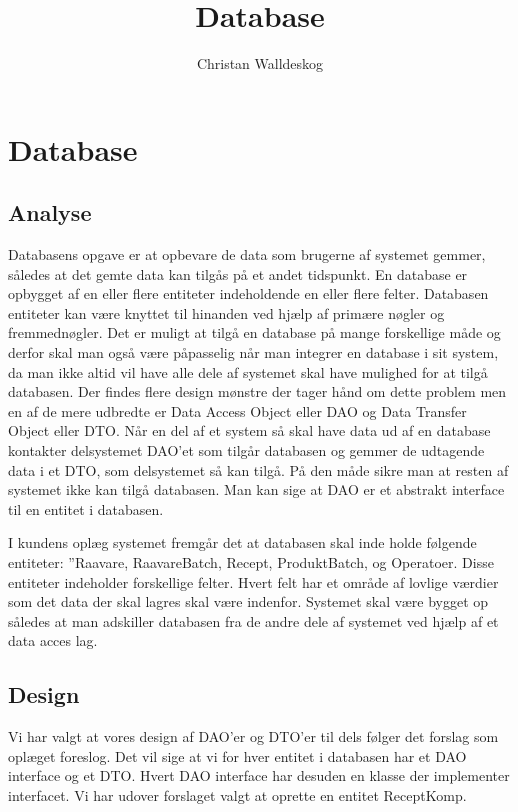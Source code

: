 \documentclass[a4paper]{article}
\title{Database}
\author{
  Christan Walldeskog
}
\begin{document}
\maketitle

\section{Database} %

\subsection{Analyse} %

Databasens opgave er at opbevare de data som brugerne af systemet gemmer, således at det gemte data kan tilgås på et andet tidspunkt. En database er opbygget af en eller flere entiteter indeholdende en eller flere felter. Databasen entiteter kan være knyttet til hinanden ved hjælp af primære nøgler og fremmednøgler. Det er muligt at tilgå en database på mange forskellige måde og derfor skal man også være påpasselig når man integrer en database i sit system, da man ikke altid vil have alle dele af systemet skal have mulighed for at tilgå databasen. Der findes flere design mønstre der tager hånd om dette problem men en af de mere udbredte er Data Access Object eller DAO og Data Transfer Object eller DTO. Når en del af et system så skal have data ud af en database kontakter delsystemet DAO’et som tilgår databasen og gemmer de udtagende data i et DTO, som delsystemet så kan tilgå. På den måde sikre man at resten af systemet ikke kan tilgå databasen. Man kan sige at DAO er et abstrakt interface til en entitet i databasen.

I kundens oplæg systemet fremgår det at databasen skal inde holde følgende entiteter: ”Raavare, RaavareBatch, Recept, ProduktBatch, og Operatoer. Disse entiteter indeholder forskellige felter. Hvert felt har et område af lovlige værdier som det data der skal lagres skal være indenfor.
Systemet skal være bygget op således at man adskiller databasen fra de andre dele af systemet ved hjælp af et data acces lag.



\subsection{Design} %

Vi har valgt at vores design af DAO’er og DTO’er til dels følger det forslag som oplæget foreslog. Det vil sige at vi for hver entitet i databasen har et DAO interface og et DTO. Hvert DAO interface har desuden en klasse der implementer interfacet.  Vi har udover forslaget valgt at oprette en entitet ReceptKomp. 
\end{document}
